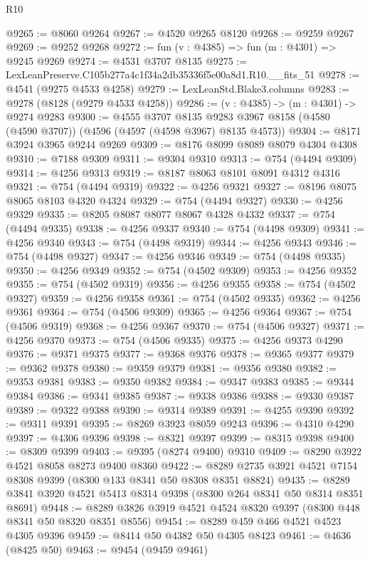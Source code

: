 \begin{lexlean}{R10}
\begin{coremodule}
@9265 := @8060 @9264
@9267 := @4520 @9265 @8120
@9268 := @9259 @9267
@9269 := @9252 @9268
@9272 := fun (v : @4385) => fun (m : @4301) => @9245 @9269
@9274 := @4531 @3707 @8135
@9275 := LexLeanPreserve.C105b277a4c1f34a2db35336f5e00a8d1.R10.__fits_51
@9278 := @4541 (@9275 @4533 @4258)
@9279 := LexLeanStd.Blake3.columns
@9283 := @9278 (@8128 (@9279 @4533 @4258))
@9286 := (v : @4385) -> (m : @4301) -> @9274 @9283
@9300 := @4555
    @3707
    @8135
    @9283
    @3967
    @8158
    (@4580 (@4590 @3707))
    (@4596 (@4597 (@4598 @3967) @8135 @4573))
@9304 := @8171 @3924 @3965 @9244 @9269
@9309 := @8176 @8099 @8089 @8079 @4304 @4308
@9310 := @7188 @9309
@9311 := @9304 @9310
@9313 := @754 (@4494 @9309)
@9314 := @4256 @9313
@9319 := @8187 @8063 @8101 @8091 @4312 @4316
@9321 := @754 (@4494 @9319)
@9322 := @4256 @9321
@9327 := @8196 @8075 @8065 @8103 @4320 @4324
@9329 := @754 (@4494 @9327)
@9330 := @4256 @9329
@9335 := @8205 @8087 @8077 @8067 @4328 @4332
@9337 := @754 (@4494 @9335)
@9338 := @4256 @9337
@9340 := @754 (@4498 @9309)
@9341 := @4256 @9340
@9343 := @754 (@4498 @9319)
@9344 := @4256 @9343
@9346 := @754 (@4498 @9327)
@9347 := @4256 @9346
@9349 := @754 (@4498 @9335)
@9350 := @4256 @9349
@9352 := @754 (@4502 @9309)
@9353 := @4256 @9352
@9355 := @754 (@4502 @9319)
@9356 := @4256 @9355
@9358 := @754 (@4502 @9327)
@9359 := @4256 @9358
@9361 := @754 (@4502 @9335)
@9362 := @4256 @9361
@9364 := @754 (@4506 @9309)
@9365 := @4256 @9364
@9367 := @754 (@4506 @9319)
@9368 := @4256 @9367
@9370 := @754 (@4506 @9327)
@9371 := @4256 @9370
@9373 := @754 (@4506 @9335)
@9375 := @4256 @9373 @4290
@9376 := @9371 @9375
@9377 := @9368 @9376
@9378 := @9365 @9377
@9379 := @9362 @9378
@9380 := @9359 @9379
@9381 := @9356 @9380
@9382 := @9353 @9381
@9383 := @9350 @9382
@9384 := @9347 @9383
@9385 := @9344 @9384
@9386 := @9341 @9385
@9387 := @9338 @9386
@9388 := @9330 @9387
@9389 := @9322 @9388
@9390 := @9314 @9389
@9391 := @4255 @9390
@9392 := @9311 @9391
@9395 := @8269 @3923 @8059 @9243
@9396 := @4310 @4290
@9397 := @4306 @9396
@9398 := @8321 @9397
@9399 := @8315 @9398
@9400 := @8309 @9399
@9403 := @9395 (@8274 @9400) @9310
@9409 := @8290 @3922 @4521 @8058 @8273 @9400 @8360
@9422 := @8289 @2735 @3921 @4521 @7154 @8308 @9399 (@8300 @133 @8341 @50 @8308 @8351 @8824)
@9435 := @8289 @3841 @3920 @4521 @5413 @8314 @9398 (@8300 @264 @8341 @50 @8314 @8351 @8691)
@9448 := @8289 @3826 @3919 @4521 @4524 @8320 @9397 (@8300 @448 @8341 @50 @8320 @8351 @8556)
@9454 := @8289 @459 @466 @4521 @4523 @4305 @9396
@9459 := @8414 @50 @4382 @50 @4305 @8423
@9461 := @4636 (@8425 @50)
@9463 := @9454 (@9459 @9461)

\end{coremodule}
\end{lexlean}
